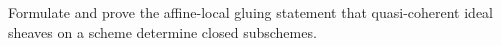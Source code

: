 \begin{problem}
Formulate and prove the affine-local gluing statement that quasi-coherent ideal sheaves on a scheme determine closed subschemes.
\end{problem}
